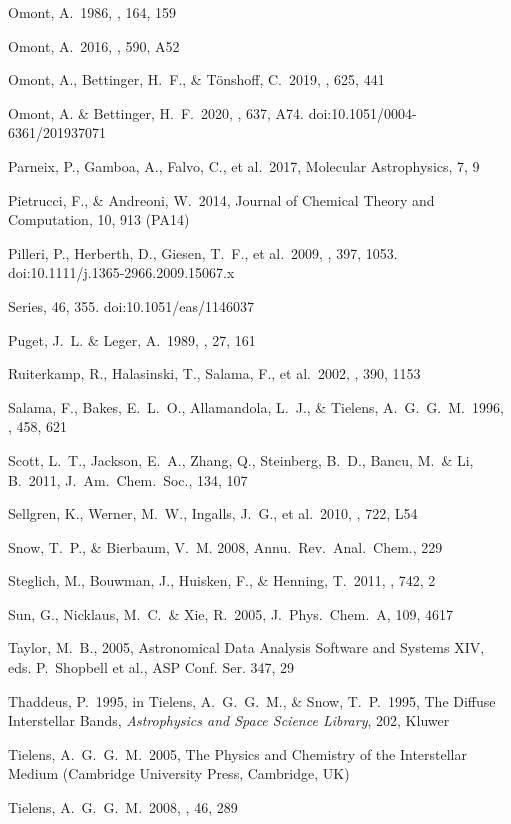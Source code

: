 \documentclass{aa}
\begin{document}
Omont, A.\ 1986, \aap, 164, 159 

Omont, A.\ 2016, \aap, 590, A52 

Omont, A., Bettinger, H.~F., \&  T\"{o}nshoff, C.\ 2019,  \aap, 625, 441 

Omont, A. \& Bettinger, H.~F.\ 2020, \aap, 637, A74. doi:10.1051/0004-6361/201937071

Parneix, P., Gamboa, A., Falvo, C., et al.\ 2017, Molecular Astrophysics, 
7, 9

Pietrucci, F., \& Andreoni, W.\ 2014, Journal of Chemical Theory and Computation, 10, 913  (PA14)

Pilleri, P., Herberth, D., Giesen, T.~F., et al.\ 2009, \mnras, 397, 1053. doi:10.1111/j.1365-2966.2009.15067.x

Series, 46, 355. doi:10.1051/eas/1146037

Puget, J.~L. \& Leger, A.\ 1989, \araa, 27, 161

Ruiterkamp, R., Halasinski, T., Salama, F., et al.\ 2002, \aap, 390, 1153 


Salama, F., Bakes, E.~L.~O., Allamandola, L.~J., \& Tielens, A.~G.~G.~M.\ 
1996, \apj, 458, 621 

Scott, L.~T.,  Jackson, E.~A., Zhang, Q., Steinberg, B.~D., Bancu, M.\ \& 
Li, B.\ 2011, J.\ Am.\ Chem.\ Soc., 134, 107

Sellgren, K., Werner,  M.~W., Ingalls, J.~G., et al.\ 2010, \apjl, 722, L54 

Snow, T.~P., \& Bierbaum, V.~M. 2008, Annu.\ Rev.\ Anal.\ Chem., 229

Steglich, M., Bouwman, J., Huisken, F., \& Henning, T.\ 2011, \apj, 742, 2 

Sun, G., Nicklaus, M.~C.\ \& Xie, R.\ 2005, J.\ Phys.\ Chem.\ A, 109, 4617

Taylor, M.~B.,  2005, Astronomical Data Analysis Software and Systems XIV, eds. P.\ Shopbell et al., ASP Conf. Ser. 347, 29

Thaddeus, P.\ 1995, in Tielens, A.~G.~G.~M., \& Snow, T.~P.\ 1995, The Diffuse Interstellar Bands, {\it Astrophysics and Space Science Library}, 202, Kluwer

Tielens, A.~G.~G.~M.\ 2005, The Physics and Chemistry of the Interstellar 
Medium (Cambridge University Press, Cambridge, UK)

Tielens, A.~G.~G.~M.\ 2008, \araa, 46, 289 
\end{document}
